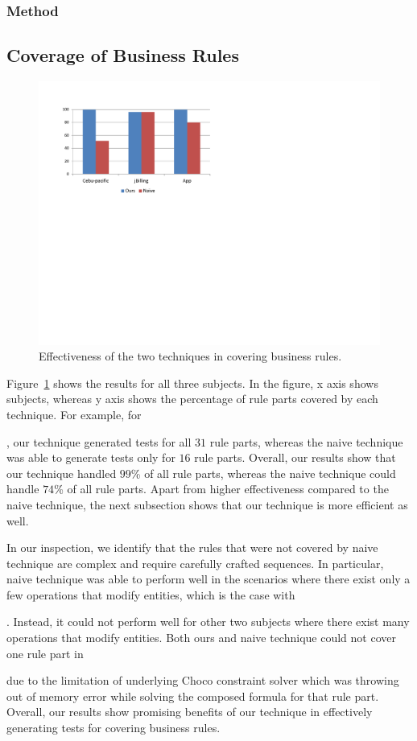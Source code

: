 \subsubsection{Method}


\subsection{Coverage of Business Rules}

\begin{figure}[t]
\centering
\includegraphics[width=\columnwidth, clip, trim = 18mm 120mm 140mm
  18mm]{figs/Study-1.pdf}
\caption{Effectiveness of the two techniques in covering business rules.}
\label{fig:effectiveness}
\end{figure}

Figure~\ref{fig:effectiveness} shows the results for all three subjects. 
In the figure, x axis shows subjects, whereas y axis shows the percentage of rule parts
covered by each technique. For example, for \subject{Cebu-pacific},
our technique generated tests for all $31$ rule parts, whereas the naive technique was able
to generate tests only for $16$ rule parts. Overall, our results show 
that our technique handled $99$\% of all rule parts, whereas the naive technique
could handle $74$\% of all rule parts. Apart from higher effectiveness compared
to the naive technique, the next subsection shows that our technique is more efficient
as well.

In our inspection, we identify that the rules that were not covered by naive technique
are complex and require carefully crafted sequences. In particular, naive technique
was able to perform well in the scenarios where there exist only a few operations
that modify entities, which is the case with \subject{jBilling}. Instead, it could not
perform well for other two subjects where there exist many operations that modify
entities. Both ours and naive technique could not cover one rule part in \subject{jBilling}
due to the limitation of underlying Choco constraint solver which was throwing 
out of memory error while solving the composed formula for that rule part. Overall,
our results show promising benefits of our technique in effectively generating
tests for covering business rules.

